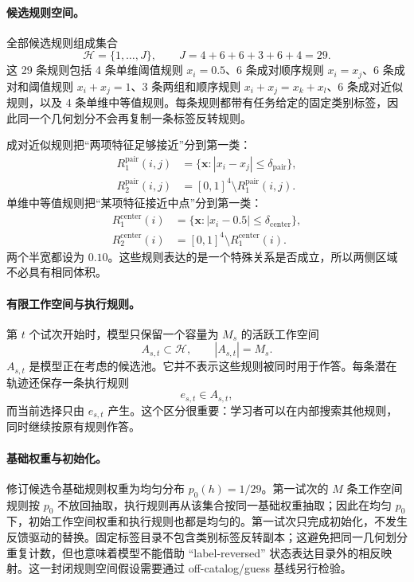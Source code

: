 \paragraph{候选规则空间。}
全部候选规则组成集合
\begin{equation}
\mathcal H=\{1,\ldots,J\},
\qquad J=4+6+6+3+6+4=29.
\label{eq:dynamic-rule-space}
\end{equation}
这 29 条规则包括 4 条单维阈值规则 $x_i=0.5$、6 条成对顺序规则
$x_i=x_j$、6 条成对和阈值规则 $x_i+x_j=1$、3 条两组和顺序规则
$x_i+x_j=x_k+x_l$、6 条成对近似规则，以及 4 条单维中等值规则。每条规则都带有任务给定的固定类别标签，因此同一个几何划分不会再复制一条标签反转规则。

成对近似规则把“两项特征足够接近”分到第一类：
\begin{align}
R_1^{\mathrm{pair}}(i,j)
&=\{\mathbf x:|x_i-x_j|\leq\delta_{\mathrm{pair}}\},
\nonumber\\
R_2^{\mathrm{pair}}(i,j)
&=[0,1]^4\setminus R_1^{\mathrm{pair}}(i,j).
\label{eq:dynamic-pair-band}
\end{align}
单维中等值规则把“某项特征接近中点”分到第一类：
\begin{align}
R_1^{\mathrm{center}}(i)
&=\{\mathbf x:|x_i-0.5|\leq\delta_{\mathrm{center}}\},
\nonumber\\
R_2^{\mathrm{center}}(i)
&=[0,1]^4\setminus R_1^{\mathrm{center}}(i).
\label{eq:dynamic-center-band}
\end{align}
两个半宽都设为 $0.10$。这些规则表达的是一个特殊关系是否成立，所以两侧区域不必具有相同体积。

\paragraph{有限工作空间与执行规则。}
第 $t$ 个试次开始时，模型只保留一个容量为 $M_s$ 的活跃工作空间
\begin{equation}
A_{s,t}\subset\mathcal H,
\qquad |A_{s,t}|=M_s.
\label{eq:dynamic-active-set}
\end{equation}
$A_{s,t}$ 是模型正在考虑的候选池。它并不表示这些规则被同时用于作答。每条潜在轨迹还保存一条执行规则
\begin{equation}
e_{s,t}\in A_{s,t},
\label{eq:dynamic-executed-rule}
\end{equation}
而当前选择只由 $e_{s,t}$ 产生。这个区分很重要：学习者可以在内部搜索其他规则，同时继续按原有规则作答。

\paragraph{基础权重与初始化。}
修订候选令基础规则权重为均匀分布 $p_0(h)=1/29$。第一试次的 $M$ 条工作空间规则按 $p_0$ 不放回抽取，执行规则再从该集合按同一基础权重抽取；因此在均匀 $p_0$ 下，初始工作空间权重和执行规则也都是均匀的。第一试次只完成初始化，不发生反馈驱动的替换。固定标签目录不包含类别标签反转副本；这避免把同一几何划分重复计数，但也意味着模型不能借助 ``label-reversed'' 状态表达目录外的相反映射。这一封闭规则空间假设需要通过 off-catalog/guess 基线另行检验。


